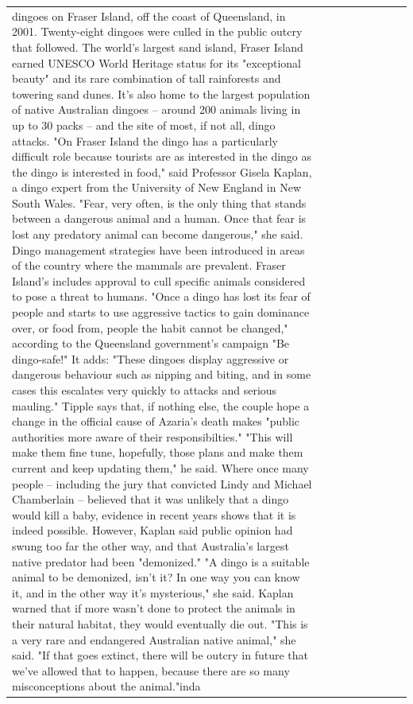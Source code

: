 \begin{table}[H]
\begin{tabular}{lllrlllll}
dingoes on Fraser Island, off the coast of Queensland, in 2001. Twenty-eight dingoes were culled in the public outcry that followed. The world's largest sand island, Fraser Island earned UNESCO World Heritage status for its "exceptional beauty" and its rare combination of tall rainforests and towering sand dunes. It's also home to the largest population of native Australian dingoes -- around 200 animals living in up to 30 packs -- and the site of most, if not all, dingo attacks. "On Fraser Island the dingo has a particularly difficult role because tourists are as interested in the dingo as the dingo is interested in food," said Professor Gisela Kaplan, a dingo expert from the University of New England in New South Wales. "Fear, very often, is the only thing that stands between a dangerous animal and a human. Once that fear is lost any predatory animal can become dangerous," she said. Dingo management strategies have been introduced in areas of the country where the mammals are prevalent. Fraser Island's includes approval to cull specific animals considered to pose a threat to humans. "Once a dingo has lost its fear of people and starts to use aggressive tactics to gain dominance over, or food from, people the habit cannot be changed," according to the Queensland government's campaign "Be dingo-safe!" It adds: "These dingoes display aggressive or dangerous behaviour such as nipping and biting, and in some cases this escalates very quickly to attacks and serious mauling." Tipple says that, if nothing else, the couple hope a change in the official cause of Azaria's death makes "public authorities more aware of their responsibilties." "This will make them fine tune, hopefully, those plans and make them current and keep updating them," he said. Where once many people -- including the jury that convicted Lindy and Michael Chamberlain -- believed that it was unlikely that a dingo would kill a baby, evidence in recent years shows that it is indeed possible. However, Kaplan said public opinion had swung too far the other way, and that Australia's largest native predator had been "demonized." "A dingo is a suitable animal to be demonized, isn't it? In one way you can know it, and in the other way it's mysterious," she said. Kaplan warned that if more wasn't done to protect the animals in their natural habitat, they would eventually die out. "This is a very rare and endangered Australian native animal," she said. "If that goes extinct, there will be outcry in future that we've allowed that to happen, because there are so many misconceptions about the animal."inda \\

\end{tabular}
\end{table}
